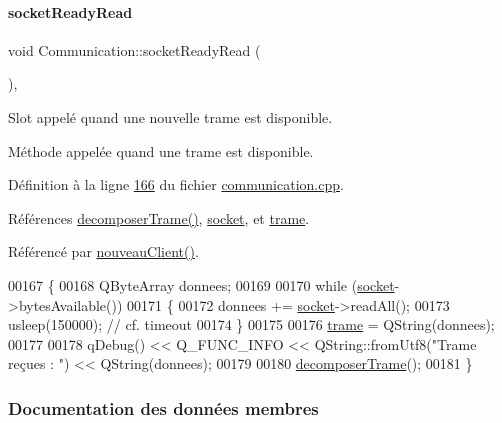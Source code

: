 \paragraph{\texorpdfstring{socket\+Ready\+Read}{socketReadyRead}}
{\footnotesize\ttfamily void Communication\+::socket\+Ready\+Read (\begin{DoxyParamCaption}{ }\end{DoxyParamCaption})\hspace{0.3cm}{\ttfamily [private]}, {\ttfamily [slot]}}



Slot appelé quand une nouvelle trame est disponible. 

Méthode appelée quand une trame est disponible. 

Définition à la ligne \hyperlink{communication_8cpp_source_l00166}{166} du fichier \hyperlink{communication_8cpp_source}{communication.\+cpp}.



Références \hyperlink{communication_8cpp_source_l00188}{decomposer\+Trame()}, \hyperlink{communication_8h_source_l00095}{socket}, et \hyperlink{communication_8h_source_l00099}{trame}.



Référencé par \hyperlink{communication_8cpp_source_l00150}{nouveau\+Client()}.


\begin{DoxyCode}
00167 \{
00168     QByteArray donnees;
00169 
00170     \textcolor{keywordflow}{while} (\hyperlink{class_communication_aa4ddc3151b305db0135d5826384645cc}{socket}->bytesAvailable())
00171     \{
00172         donnees += \hyperlink{class_communication_aa4ddc3151b305db0135d5826384645cc}{socket}->readAll();
00173         usleep(150000); \textcolor{comment}{// cf. timeout}
00174     \}
00175 
00176     \hyperlink{class_communication_ac8f5004bfaaf7f538ba5ae93255f772b}{trame} = QString(donnees);
00177 
00178     qDebug() << Q\_FUNC\_INFO << QString::fromUtf8(\textcolor{stringliteral}{"Trame reçues : "}) << QString(donnees);
00179 
00180     \hyperlink{class_communication_aaf5333662717e69837d2d39164e5a303}{decomposerTrame}();
00181 \}
\end{DoxyCode}


\subsubsection{Documentation des données membres}
\mbox{\label{class_communication_a494d609c206472041468e362d7cfc0e5}} 
